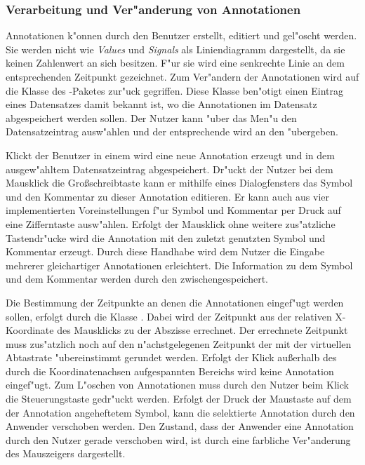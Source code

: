 
\subsubsection{Verarbeitung und Ver"anderung von Annotationen}
\label{sec:edit_annotations}

Annotationen k"onnen durch den Benutzer erstellt, editiert und gel"oscht werden.
Sie werden nicht wie \emph{Values} und \emph{Signals} als Liniendiagramm dargestellt, da sie keinen Zahlenwert an sich besitzen.
F"ur sie wird eine senkrechte Linie an dem entsprechenden Zeitpunkt gezeichnet.
Zum Ver"andern der Annotationen wird auf die Klasse  des -Paketes zur"uck gegriffen.
Diese Klasse ben"otigt einen Eintrag eines Datensatzes damit bekannt ist, wo die Annotationen im Datensatz abgespeichert werden sollen.
Der Nutzer kann "uber das Men"u den Datensatzeintrag ausw"ahlen und der entsprechende  wird an den  "ubergeben.

Klickt der Benutzer in einem  wird eine neue Annotation erzeugt und in dem ausgew"ahltem Datensatzeintrag abgespeichert.
Dr"uckt der Nutzer bei dem Mausklick die Gro{\ss}schreibtaste kann er mithilfe eines Dialogfensters das Symbol und den Kommentar zu dieser Annotation editieren.
Er kann auch aus vier implementierten Voreinstellungen f"ur Symbol und Kommentar per Druck auf eine Zifferntaste ausw"ahlen.
Erfolgt der Mausklick ohne weitere zus"atzliche Tastendr"ucke wird die Annotation mit den zuletzt genutzten Symbol und Kommentar erzeugt.
Durch diese Handhabe wird dem Nutzer die Eingabe mehrerer gleichartiger Annotationen erleichtert.
Die Information zu dem Symbol und dem Kommentar werden durch den  zwischengespeichert.

Die Bestimmung der Zeitpunkte an denen die Annotationen eingef"ugt werden sollen, erfolgt durch die Klasse .
Dabei wird der Zeitpunkt aus der relativen X-Koordinate des Mausklicks zu der Abszisse errechnet.
Der errechnete Zeitpunkt muss zus"atzlich noch auf den n"achstgelegenen Zeitpunkt der mit der virtuellen Abtastrate "ubereinstimmt gerundet werden.
Erfolgt der Klick au{\ss}erhalb des durch die Koordinatenachsen aufgespannten Bereichs wird keine Annotation eingef"ugt.
Zum L"oschen von Annotationen muss durch den Nutzer beim Klick die Steuerungstaste gedr"uckt werden.
Erfolgt der Druck der Maustaste auf dem der Annotation angeheftetem Symbol, kann die selektierte Annotation durch den Anwender verschoben werden.
Den Zustand, dass der Anwender eine Annotation durch den Nutzer gerade verschoben wird, ist durch eine farbliche Ver"anderung des Mauszeigers dargestellt.

